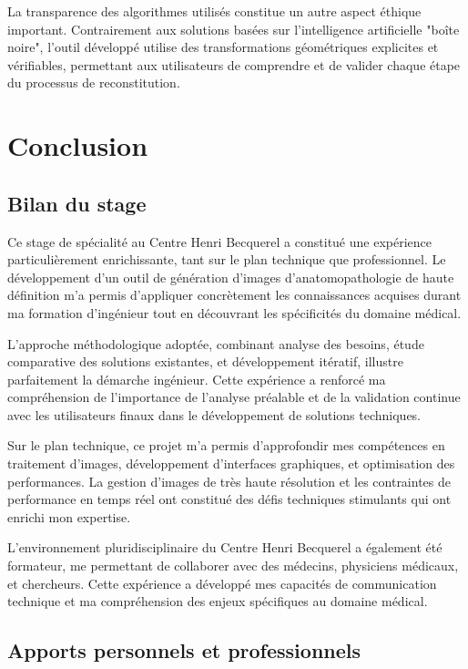 \documentclass[12pt,a4paper]{report}
\begin{document}
La transparence des algorithmes utilisés constitue un autre aspect éthique important. Contrairement aux solutions basées sur l'intelligence artificielle "boîte noire", l'outil développé utilise des transformations géométriques explicites et vérifiables, permettant aux utilisateurs de comprendre et de valider chaque étape du processus de reconstitution.

\chapter{Conclusion}

\section{Bilan du stage}

Ce stage de spécialité au Centre Henri Becquerel a constitué une expérience particulièrement enrichissante, tant sur le plan technique que professionnel. Le développement d'un outil de génération d'images d'anatomopathologie de haute définition m'a permis d'appliquer concrètement les connaissances acquises durant ma formation d'ingénieur tout en découvrant les spécificités du domaine médical.

L'approche méthodologique adoptée, combinant analyse des besoins, étude comparative des solutions existantes, et développement itératif, illustre parfaitement la démarche ingénieur. Cette expérience a renforcé ma compréhension de l'importance de l'analyse préalable et de la validation continue avec les utilisateurs finaux dans le développement de solutions techniques.

Sur le plan technique, ce projet m'a permis d'approfondir mes compétences en traitement d'images, développement d'interfaces graphiques, et optimisation des performances. La gestion d'images de très haute résolution et les contraintes de performance en temps réel ont constitué des défis techniques stimulants qui ont enrichi mon expertise.

L'environnement pluridisciplinaire du Centre Henri Becquerel a également été formateur, me permettant de collaborer avec des médecins, physiciens médicaux, et chercheurs. Cette expérience a développé mes capacités de communication technique et ma compréhension des enjeux spécifiques au domaine médical.

\section{Apports personnels et professionnels}
\end{document}

